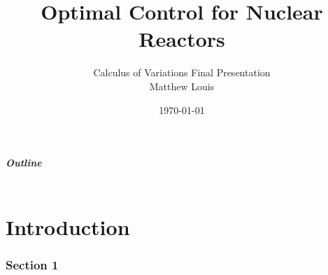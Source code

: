 \documentclass[10pt,compress]{beamer}
\title[Short title] %
{Optimal Control for Nuclear Reactors}
\author[M. Louis]%
{Calculus of Variations Final Presentation\texorpdfstring{\\}{}Matthew Louis}
\date{\today}
\begin{document}
{ %
\setlength{\headheight}{0in}


\begin{frame}
\titlepage
\end{frame}
}
\addtocounter{framenumber}{-1}

{
\begin{frame}\frametitle{Outline}
  \begin{columns}
  	\begin{column}{.7\textwidth}
  		\begin{tocblock}{}
  		\vspace*{1em}\tableofcontents[onlyparts]
  		\end{tocblock}		
  	\end{column}
  \end{columns}
\end{frame} 
}


\part[Intro]{Introduction} 

\section{Section 1}
\end{document}
